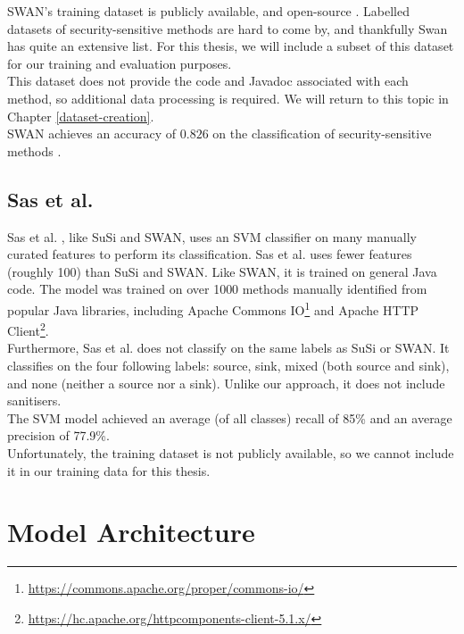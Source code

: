 \noindent
SWAN's training dataset is publicly available, and open-source \cite{swan_github}. Labelled datasets of security-sensitive methods are hard to come by, and thankfully Swan has quite an extensive list. For this thesis, we will include a subset of this dataset for our training and evaluation purposes.  \\

\noindent
This dataset does not provide the code and Javadoc associated with each method, so additional data processing is required. We will return to this topic in Chapter \ref{dataset-creation}. \\

\noindent
SWAN achieves an accuracy of $0.826$ on the classification of security-sensitive methods \cite{swanassist}.

\subsection{Sas et al.}

\noindent
Sas et al. \cite{autodetection}, like SuSi and SWAN, uses an SVM classifier on many manually curated features to perform its classification. Sas et al. uses fewer features (roughly 100) than SuSi and SWAN. Like SWAN, it is trained on general Java code. The model was trained on over 1000 methods manually identified from popular Java libraries, including Apache Commons IO\footnote{\url{https://commons.apache.org/proper/commons-io/}} and Apache HTTP Client\footnote{\url{https://hc.apache.org/httpcomponents-client-5.1.x/}}. \\

\noindent
Furthermore, Sas et al. does not classify on the same labels as SuSi or SWAN. It classifies on the four following labels: source, sink, mixed (both source and sink), and none (neither a source nor a sink). Unlike our approach, it does not include sanitisers. \\

\noindent
The SVM model achieved an average (of all classes) recall of 85\% and an average precision of 77.9\%.\\ 

\noindent
Unfortunately, the training dataset is not publicly available, so we cannot include it in our training data for this thesis.

\section{Model Architecture}
\label{model_architecture}
